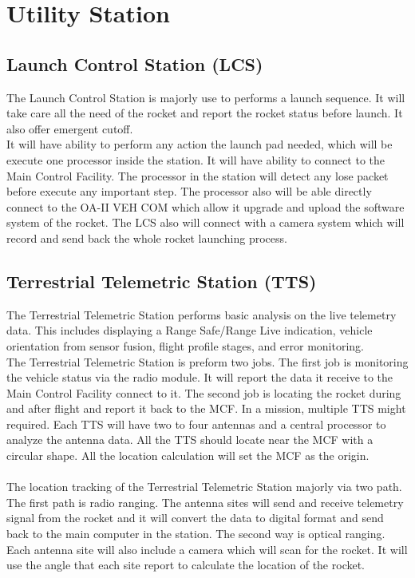 \documentclass[12pt,article]{memoir}
\begin{document}
\newpage
\chapter{Utility Station}
\section{Launch Control Station (LCS)}
The Launch Control Station is majorly use to performs a launch sequence. It will take care all the need of the rocket and report the rocket status before launch. It also offer emergent cutoff. \\
It will have ability to perform any action the launch pad needed, which will be execute one processor inside the station. It will have ability to connect to the Main Control Facility. The processor in the station will detect any lose packet before execute any important step. The processor also will be able directly connect to the OA-II VEH COM which allow it upgrade and upload the software system of the rocket. The LCS also will connect with a camera system which will record and send back the whole rocket launching process. 
\section{Terrestrial Telemetric Station (TTS)}
The Terrestrial Telemetric Station performs basic analysis on the live telemetry data. This includes displaying a Range Safe/Range Live indication, vehicle orientation from sensor fusion, flight profile stages, and error monitoring.\\
The Terrestrial Telemetric Station is preform two jobs. The first job is monitoring the vehicle status via the radio module. It will report the data it receive to the Main Control Facility connect to it. The second job is locating the rocket during and after flight and report it back to the MCF. In a mission, multiple TTS might required. Each TTS will have two to four antennas and a central processor to analyze the antenna data. All the TTS should locate near the MCF with a circular shape. All the location calculation will set the MCF as the origin.\\\\
The location tracking of the Terrestrial Telemetric Station majorly via two path. The first path is radio ranging. The antenna sites will send and receive telemetry signal from the rocket and it will convert the data to digital format and send back to the main computer in the station. The second way is optical ranging. Each antenna site will also include a camera which will scan for the rocket. It will use the angle that each site report to calculate the location of the rocket. 
\end{document}
